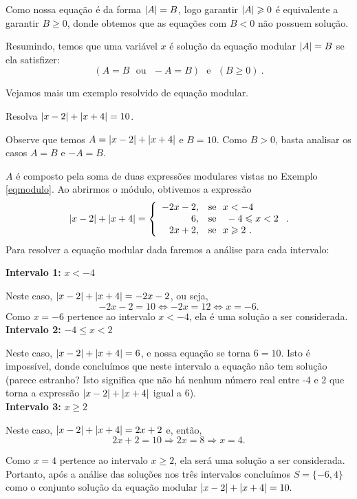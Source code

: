  Como nossa equação é da forma  $\left|A\right|= B$, logo garantir $\left|A\right|\geqslant 0$ é equivalente a garantir $B \geq 0$, donde obtemos que as equações com $B < 0$ não possuem solução.

 Resumindo, temos que uma variável $x$ é solução da equação modular $\left|A\right|= B$ se ela satisfizer:
\begin{equation*}
(A= B \ \ \ \text{ou} \ \ \ -A= B) \ \ \ \text{e} \ \ \ (B \geq 0) \ . 
\end{equation*}

 Vejamos mais um exemplo resolvido de equação modular.

 \begin{exem}
   Resolva $\left|x-2\right| + \left|x+4\right|= 10$.

   Observe que temos $A = \left|x-2\right| + \left|x+4\right|$ e $B = 10$. Como $B > 0$, basta analisar os casos $A= B$ e $-A= B$.

   $A$ é composto pela soma de duas expressões modulares vistas no Exemplo \ref{eqmodulo}. Ao abrirmos o módulo, obtivemos a expressão 
   \[ \left|x-2\right| + \left|x+4\right| = \left\{\begin{array}{rl}
      -2x-2, & \text{se} \ \ x < -4 \\
      6, & \text{se } \ \ -4 \leqslant x < 2 \\
      2x + 2, & \text{se} \ \ x \geqslant 2 \ .
     \end{array}\right..
  \]
 Para resolver a equação modular  dada faremos a análise para cada intervalo:

 \textbf{Intervalo 1:} $x < -4$

 Neste caso, $\left|x-2\right| + \left|x+4\right|= -2x-2$, ou seja, 
\begin{equation*}
-2x-2= 10 \Leftrightarrow -2x= 12 \Leftrightarrow x= -6.
\end{equation*}
 Como $x= -6$ pertence ao intervalo $x< -4$, ela é uma solução a ser considerada.\\

 \textbf{Intervalo 2:} $-4 \leq x < 2$

 Neste caso, $\left|x-2\right| + \left|x+4\right|= 6$, e nossa equação se torna $6= 10$. Isto é impossível, donde concluímos que neste intervalo a equação não tem solução (parece estranho? Isto significa que não há nenhum número real entre -4 e 2 que torna a expressão $\left|x-2\right| + \left|x+4\right|$ igual a 6).\\

 \textbf{Intervalo 3:} $x \geq 2 $

 Neste caso, $\left|x-2\right| + \left|x+4\right|= 2x + 2$ e, então,
\begin{equation*}
2x + 2= 10 \Rightarrow 2x= 8 \Rightarrow x= 4.
\end{equation*}

Como $x= 4$ pertence ao intervalo $x \geq 2$, ela será uma solução a ser considerada.\\

 Portanto, após a análise das soluções nos três intervalos concluímos $S=\{-6, 4\}$ como  o conjunto solução da equação modular
$\left|x-2\right| + \left|x+4\right|= 10.$
 \end{exem}


